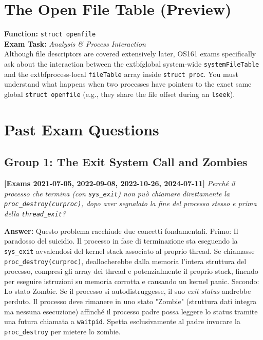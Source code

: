 \section{The Open File Table (Preview)}

\begin{tcolorbox}[colback=red!5!white, colframe=red!75!black, title=\textbf{! EXAM FOCUS: IMPLEMENTATION REQUIRED}]
\textbf{Function:} \texttt{struct openfile} \\
\textbf{Exam Task:} \textit{Analysis \& Process Interaction} \\
Although file descriptors are covered extensively later, OS161 exams specifically ask about the interaction between the 	extbf{global} system-wide \texttt{systemFileTable} and the 	extbf{process-local} \texttt{fileTable} array inside \texttt{struct proc}. You must understand what happens when two processes have pointers to the exact same global \texttt{struct openfile} (e.g., they share the file offset during an \texttt{lseek}).
\end{tcolorbox}

\section*{Past Exam Questions}

\subsection*{Group 1: The Exit System Call and Zombies}

\textbf{[Exams 2021-07-05, 2022-09-08, 2022-10-26, 2024-07-11]}
\textit{Perché il processo che termina (con \texttt{sys\_exit}) non può chiamare direttamente la \texttt{proc\_destroy(curproc)}, dopo aver segnalato la fine del processo stesso e prima della \texttt{thread\_exit}?}

\textbf{Answer:}
Questo problema racchiude due concetti fondamentali.
Primo: Il paradosso del suicidio. Il processo in fase di terminazione sta eseguendo la \texttt{sys\_exit} avvalendosi del kernel stack associato al proprio thread. Se chiamasse \texttt{proc\_destroy(curproc)}, deallocherebbe dalla memoria l'intera struttura del processo, compresi gli array dei thread e potenzialmente il proprio stack, finendo per eseguire istruzioni su memoria corrotta e causando un kernel panic. 
Secondo: Lo stato Zombie. Se il processo si autodistruggesse, il suo \textit{exit status} andrebbe perduto. Il processo deve rimanere in uno stato "Zombie" (struttura dati integra ma nessuna esecuzione) affinché il processo padre possa leggere lo status tramite una futura chiamata a \texttt{waitpid}. Spetta esclusivamente al padre invocare la \texttt{proc\_destroy} per mietere lo zombie.

